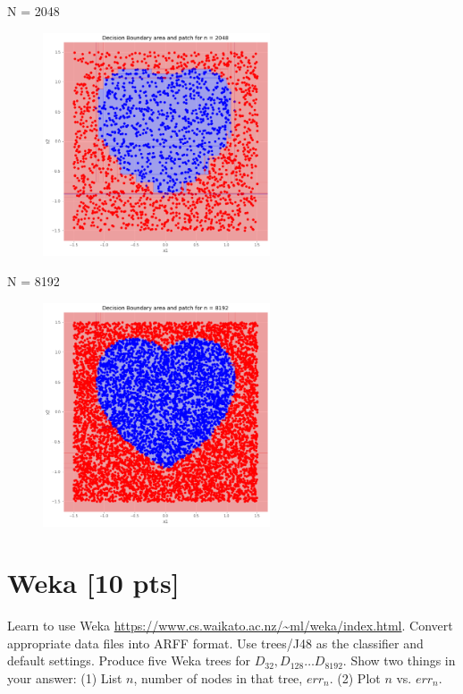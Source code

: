 \documentclass[a4paper]{article}
\theoremstyle{definition}
\newenvironment{soln}{
    \leavevmode\color{blue}\ignorespaces
}{}
\begin{document}
\begin{soln}
N = 2048

\begin{figure}[H]
	\centering
	\includegraphics[width=0.6\textwidth]{n_2048.png}
	\captionsetup{labelformat=empty}
	\caption{}
	\label{fig:my_label}
\end{figure}


N = 8192

\begin{figure}[H]
	\centering
	\includegraphics[width=0.6\textwidth]{n_8192.png}
	\captionsetup{labelformat=empty}
	\caption{}
	\label{fig:my_label}
\end{figure}
\end{soln}

\section{Weka [10 pts]}
Learn to use Weka \url{https://www.cs.waikato.ac.nz/~ml/weka/index.html}.
Convert appropriate data files into ARFF format.
Use trees/J48 as the classifier and default settings.
Produce five Weka trees for $D_{32}, D_{128} \ldots D_{8192}$.  
Show two things in your answer: (1) List $n$, number of nodes in that tree, $err_n$. (2) Plot $n$ vs. $err_n$.
\end{document}

